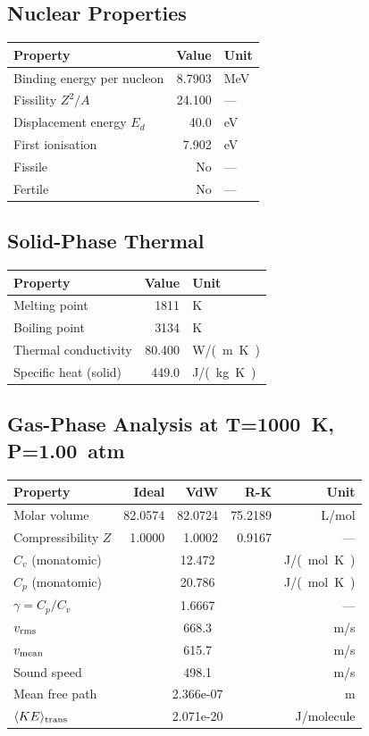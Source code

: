 \documentclass[11pt,a4paper]{article}
\begin{document}
\subsection{Nuclear Properties}
\begin{tabular}{lrl}
  \toprule
  Property & Value & Unit \\
  \midrule
  Binding energy per nucleon & 8.7903 & \si{MeV} \\
  Fissility $Z^2/A$ & 24.100 & --- \\
  Displacement energy $E_d$ & 40.0 & \si{eV} \\
  First ionisation & 7.902 & \si{eV} \\
  Fissile & No & --- \\
  Fertile & No & --- \\
  \bottomrule
\end{tabular}

\subsection{Solid-Phase Thermal}
\begin{tabular}{lrl}
  \toprule
  Property & Value & Unit \\
  \midrule
  Melting point & 1811 & \si{K} \\
  Boiling point & 3134 & \si{K} \\
  Thermal conductivity & 80.400 & \si{W/(m.K)} \\
  Specific heat (solid) & 449.0 & \si{J/(kg.K)} \\
  \bottomrule
\end{tabular}

\subsection{Gas-Phase Analysis at T=\SI{1000}{K}, P=\SI{1.00}{atm}}
\begin{tabular}{lrrrr}
  \toprule
  Property & Ideal & VdW & R-K & Unit \\
  \midrule
  Molar volume & 82.0574 & 82.0724 & 75.2189 & \si{L/mol} \\
  Compressibility $Z$ & 1.0000 & 1.0002 & 0.9167 & --- \\
  \midrule
  $C_v$ (monatomic) & \multicolumn{3}{c}{12.472} & \si{J/(mol.K)} \\
  $C_p$ (monatomic) & \multicolumn{3}{c}{20.786} & \si{J/(mol.K)} \\
  $\gamma = C_p/C_v$ & \multicolumn{3}{c}{1.6667} & --- \\
  $v_{\rm rms}$ & \multicolumn{3}{c}{668.3} & \si{m/s} \\
  $v_{\rm mean}$ & \multicolumn{3}{c}{615.7} & \si{m/s} \\
  Sound speed & \multicolumn{3}{c}{498.1} & \si{m/s} \\
  Mean free path & \multicolumn{3}{c}{2.366e-07} & \si{m} \\
  $\langle KE \rangle_{\rm trans}$ & \multicolumn{3}{c}{2.071e-20} & \si{J/molecule} \\
  \bottomrule
\end{tabular}
\end{document}
